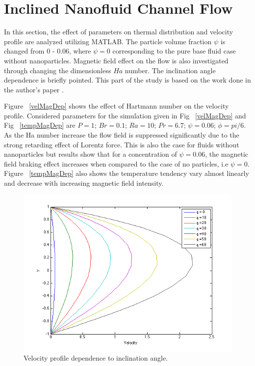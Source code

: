 \section{Inclined Nanofluid Channel Flow}

In this section, the effect of parameters on thermal distribution and velocity profile are analyzed utilizing MATLAB. The particle volume fraction  $\psi $ is changed from 0 - 0.06, where $\psi  =0$ corresponding to the pure base fluid case without nanoparticles. Magnetic field effect on the flow is also investigated through changing the dimensionless $Ha$ number. The inclination angle dependence is briefly pointed. This part of the study is based on the work done in the author's paper \cite{baskaya2014investigation}.

Figure ~\ref{velMagDep} shows the effect of Hartmann number on the velocity profile.  Considered parameters for the simulation given in Fig ~\ref{velMagDep} and Fig ~\ref{tempMagDep} are $P = 1$; $Br = 0.1$; $Ra = 10$;  $Pr = 6.7$;  $\psi  =0.06$;  $\phi = pi/6$. As the Ha number increase the flow field is suppressed significantly due to the strong retarding effect of Lorentz force. This is also the case for fluids without nanoparticles but results show that for a concentration of $\psi  =0.06$, the magnetic field braking effect increases when compared to the case of no particles, i.e $\psi  =0$. Figure ~\ref{tempMagDep} also shows the temperature tendency vary almost linearly and decrease with increasing magnetic field intensity.


\begin{figure}
\begin{center}
\includegraphics[scale=0.78]{figures/velocityIncAngDep.png}
\end{center}
\caption{Velocity profile dependence to inclination angle.}
\label{velincAngDep} 
\end{figure}

